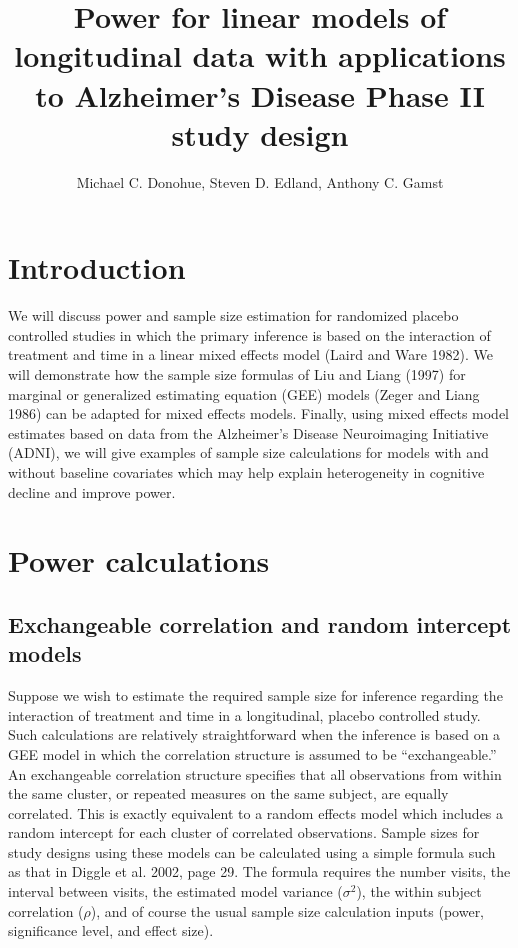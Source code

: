 \documentclass[12pt]{article}
\title{Power for linear models of longitudinal data with applications to Alzheimer's Disease Phase II study design}
\author{Michael C. Donohue, Steven D. Edland, Anthony C. Gamst}
\begin{document}
\maketitle

\section{Introduction}
We will discuss power and sample size estimation for randomized placebo controlled studies in which the primary inference is based on the interaction of treatment and time in a linear mixed effects model (Laird and Ware 1982). We will demonstrate how the sample size formulas of Liu and Liang (1997) for marginal or generalized estimating equation (GEE) models (Zeger and Liang 1986) can be adapted for mixed effects models. Finally, using mixed effects model estimates based on data from the Alzheimer's Disease Neuroimaging Initiative (ADNI), we will give examples of sample size calculations for models with and without baseline covariates which may help explain heterogeneity in cognitive decline and improve power.

\section{Power calculations}
\subsection{Exchangeable correlation and random intercept models}
Suppose we wish to estimate the required sample size for inference regarding the interaction of treatment and time in a longitudinal, placebo controlled study. Such calculations are relatively straightforward when the inference is based on a GEE model in which the correlation structure is assumed to be ``exchangeable.'' An exchangeable correlation structure specifies that all observations from within the same cluster, or repeated measures on the same subject, are equally correlated. This is exactly equivalent to a random effects model which includes a random intercept for each cluster of correlated observations. Sample sizes for study designs using these models can be calculated using a simple formula such as that in Diggle et al. 2002, page 29. The formula requires the number visits, the interval between visits, the estimated model variance ($\sigma^2$), the within subject correlation ($\rho$), and of course the usual sample size calculation inputs (power, significance level, and effect size). 
\end{document}
